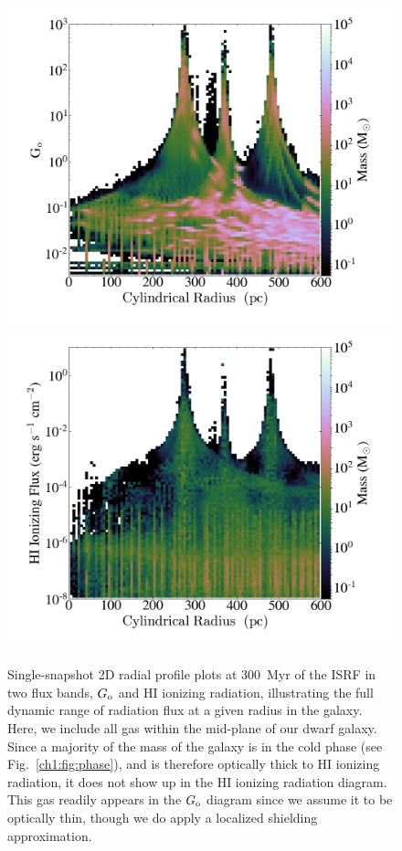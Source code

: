 \begin{figure}
\centering
\includegraphics[width=0.62\linewidth]{figures/ch1/g_o_2D_phase}\\
\includegraphics[width=0.62\linewidth]{figures/ch1/q_o_2D_phase}
\caption{Single-snapshot 2D radial profile plots at 300~Myr of the ISRF in two flux bands, $G_{\rm o}$ and HI ionizing radiation, illustrating the full dynamic range of radiation flux at a given radius in the galaxy. Here, we include all gas within the mid-plane of our dwarf galaxy. Since a majority of the mass of the galaxy is in the cold phase (see Fig.~\ref{ch1:fig:phase}), and is therefore optically thick to HI ionizing radiation, it does not show up in the HI ionizing radiation diagram. This gas readily appears in the $G_{\rm o}$ diagram since we assume it to be optically thin, though we do apply a localized shielding approximation.}
\label{ch1:fig:ISRF_2D}
\end{figure}

